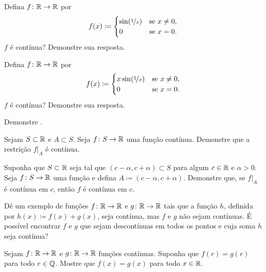 \begin{exercise}
Defina $f \colon {\mathbb{R}} \to {\mathbb{R}}$ por
\begin{equation*}
f(x) \coloneqq
\begin{cases}
\sin(\nicefrac{1}{x}) & \text{se } x \neq 0, \\
0 & \text{se } x=0.
\end{cases}
\avoidbreak
\end{equation*}
$f$ é contínua? Demonstre sua resposta.
\end{exercise}

\begin{exercise}
Defina $f \colon {\mathbb{R}} \to {\mathbb{R}}$ por
\begin{equation*}
f(x) \coloneqq
\begin{cases}
x \sin(\nicefrac{1}{x}) & \text{se } x \neq 0, \\
0 & \text{se } x=0.
\end{cases}
\avoidbreak
\end{equation*}
$f$ é contínua? Demonstre sua resposta.
\end{exercise}

\begin{exercise}
Demonstre .
\end{exercise}

\begin{exercise} \label{exercise:restrictioncontinuous}
Sejam $S \subset {\mathbb{R}}$ e $A \subset S$. Seja $f \colon S \to {\mathbb{R}}$
uma função contínua.
Demonstre que a restrição $f|_A$ é contínua.
\end{exercise}

\begin{exercise}
Suponha que $S \subset {\mathbb{R}}$ seja tal que $(c-\alpha,c+\alpha) \subset S$
para algum $c \in {\mathbb{R}}$ e $\alpha > 0$.
Seja $f \colon S \to {\mathbb{R}}$ uma função e defina $A \coloneqq (c-\alpha,c+\alpha)$.
Demonstre que, se $f|_A$ é contínua em $c$, então $f$ é contínua em $c$.
\end{exercise}

\begin{exercise}
Dê um exemplo de funções $f \colon {\mathbb{R}} \to {\mathbb{R}}$ e $g \colon {\mathbb{R}} \to {\mathbb{R}}$
tais que a função $h$, definida por $h(x) \coloneqq f(x) + g(x)$, seja contínua,
mas $f$ e $g$ não sejam contínuas. É possível encontrar $f$ e $g$ que sejam
descontínuas em todos os pontos e cuja soma $h$ seja contínua?
\end{exercise}

\begin{exercise}
Sejam $f \colon {\mathbb{R}} \to {\mathbb{R}}$ e
$g \colon {\mathbb{R}} \to {\mathbb{R}}$ funções contínuas. Suponha que
$f(r) = g(r)$ para todo $r \in {\mathbb{Q}}$.
Mostre que $f(x) = g(x)$ para todo $x \in {\mathbb{R}}$.
\end{exercise}


